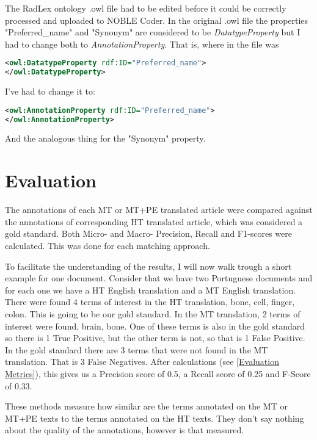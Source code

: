 The RadLex ontology .owl file had to be edited before it could be correctly processed and uploaded to NOBLE Coder. In the original .owl file the properties  "Preferred\_name" and "Synonym" are considered to be \textit{DatatypeProperty} but I had to change both to \textit{AnnotationProperty}. That is, where in the file was


\begin{lstlisting}[language=xml]
<owl:DatatypeProperty rdf:ID="Preferred_name">
</owl:DatatypeProperty>
\end{lstlisting}


I've had to change it to:


\begin{lstlisting}[language=xml]
<owl:AnnotationProperty rdf:ID="Preferred_name">
</owl:AnnotationProperty>
\end{lstlisting}


And the analogous thing for the "Synonym" property.

\section{Evaluation}

The annotations of each MT or MT+PE translated article were compared against the annotations of corresponding HT translated article, which was considered a gold standard. Both Micro- and Macro- Precision, Recall and F1-scores were calculated. This was done for each matching approach. 

To facilitate the understanding of the results, I will now walk trough a short example for one document. Consider that we have two Portuguese documents and for each one we have a HT English translation and a MT English translation. There were found 4 terms of interest in the HT translation, {bone, cell, finger, colon}. This is going to be our gold standard. In the MT translation, 2 terms of interest were found, {brain, bone}. One of these terms is also in the gold standard so there is 1 True Positive, but the other term is  not, so that is 1 False Positive. In the gold standard there are 3 terms that were not found in the MT translation. That is 3 False Negatives. After calculations (see \ref{Evaluation Metrics}), this gives us a Precision score of 0.5, a Recall score of 0.25 and F-Score of 0.33. 

These methods measure how similar are the terms annotated on the MT or MT+PE texts to the terms annotated on the HT texts. They don't say nothing about the quality of the annotations, however is that measured. 





 